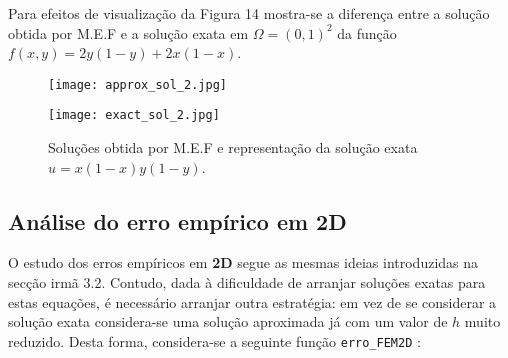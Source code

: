 \documentclass{article}
\theoremstyle{definition}
\theoremstyle{plain}
\numberwithin{equation}{section}
\newcommand{\tab}{\hspace{10mm}}
\begin{document}
\tab Para efeitos de visualização da Figura 14 mostra-se a diferença entre a solução obtida por M.E.F e a solução exata em $\Omega=(0,1)^2$ da função $f(x,y)=2y(1-y)+2x(1-x)$.

\begin{figure} [H]
\centering
\begin{minipage}{0.5\textwidth}
  \centering
  \texttt{[image: approx\_sol\_2.jpg]}
\end{minipage}%
\begin{minipage}{0.5\textwidth}
  \centering
  \texttt{[image: exact\_sol\_2.jpg]}
\end{minipage}
\caption{Soluções obtida por M.E.F e representação da solução exata $u=x(1-x)y(1-y)   $.}
\end{figure}

\subsection{Análise do erro empírico em 2D}

\tab O estudo dos erros empíricos em \textbf{2D} segue as mesmas ideias introduzidas na secção irmã 3.2. Contudo, dada à dificuldade de arranjar soluções exatas para estas equações, é necessário arranjar outra estratégia: em vez de se considerar a solução exata considera-se uma solução aproximada já com um valor de $h$ muito reduzido. Desta forma, considera-se a seguinte função \verb +erro_FEM2D+ :

\vspace{5mm}
\end{document}

